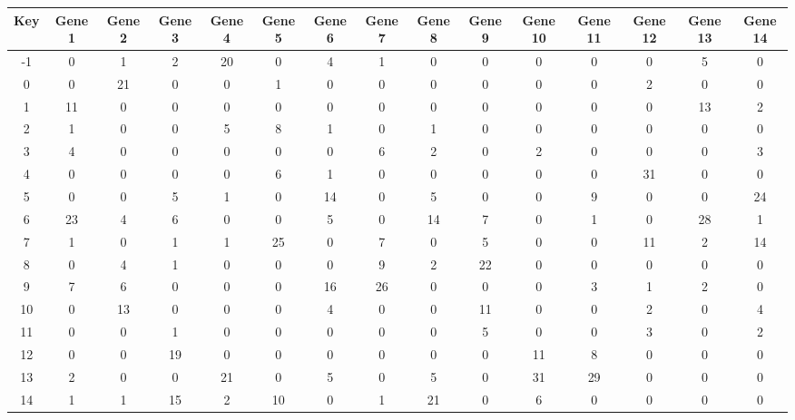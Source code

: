 \begin{tabular}{|c|c|c|c|c|c|c|c|c|c|c|c|c|c|c|}
\hline
Key & Gene 1 & Gene 2 & Gene 3 & Gene 4 & Gene 5 & Gene 6 & Gene 7 & Gene 8 & Gene 9 & Gene 10 & Gene 11 & Gene 12 & Gene 13 & Gene 14 \\
\hline
-1 & 0 & 1 & 2 & 20 & 0 & 4 & 1 & 0 & 0 & 0 & 0 & 0 & 5 & 0 \\
0 & 0 & 21 & 0 & 0 & 1 & 0 & 0 & 0 & 0 & 0 & 0 & 2 & 0 & 0 \\
1 & 11 & 0 & 0 & 0 & 0 & 0 & 0 & 0 & 0 & 0 & 0 & 0 & 13 & 2 \\
2 & 1 & 0 & 0 & 5 & 8 & 1 & 0 & 1 & 0 & 0 & 0 & 0 & 0 & 0 \\
3 & 4 & 0 & 0 & 0 & 0 & 0 & 6 & 2 & 0 & 2 & 0 & 0 & 0 & 3 \\
4 & 0 & 0 & 0 & 0 & 6 & 1 & 0 & 0 & 0 & 0 & 0 & 31 & 0 & 0 \\
5 & 0 & 0 & 5 & 1 & 0 & 14 & 0 & 5 & 0 & 0 & 9 & 0 & 0 & 24 \\
6 & 23 & 4 & 6 & 0 & 0 & 5 & 0 & 14 & 7 & 0 & 1 & 0 & 28 & 1 \\
7 & 1 & 0 & 1 & 1 & 25 & 0 & 7 & 0 & 5 & 0 & 0 & 11 & 2 & 14 \\
8 & 0 & 4 & 1 & 0 & 0 & 0 & 9 & 2 & 22 & 0 & 0 & 0 & 0 & 0 \\
9 & 7 & 6 & 0 & 0 & 0 & 16 & 26 & 0 & 0 & 0 & 3 & 1 & 2 & 0 \\
10 & 0 & 13 & 0 & 0 & 0 & 4 & 0 & 0 & 11 & 0 & 0 & 2 & 0 & 4 \\
11 & 0 & 0 & 1 & 0 & 0 & 0 & 0 & 0 & 5 & 0 & 0 & 3 & 0 & 2 \\
12 & 0 & 0 & 19 & 0 & 0 & 0 & 0 & 0 & 0 & 11 & 8 & 0 & 0 & 0 \\
13 & 2 & 0 & 0 & 21 & 0 & 5 & 0 & 5 & 0 & 31 & 29 & 0 & 0 & 0 \\
14 & 1 & 1 & 15 & 2 & 10 & 0 & 1 & 21 & 0 & 6 & 0 & 0 & 0 & 0 \\
\hline
\end{tabular}